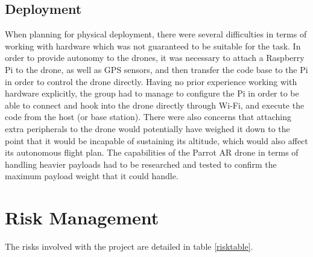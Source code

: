 \subsection{Deployment}
When planning for physical deployment, there were several difficulties in terms of working with hardware which was not guaranteed to be suitable for the task. In order to provide autonomy to the drones, it was necessary to attach a Raspberry Pi to the drone, as well as GPS sensors, and then transfer the code base to the Pi in order to control the drone directly. Having no prior experience working with hardware explicitly, the group had to manage to configure the Pi in order to be able to connect and hook into the drone directly through Wi-Fi, and execute the code from the host (or base station). There were also concerns that attaching extra peripherals to the drone would potentially have weighed it down to the point that it would be incapable of sustaining its altitude, which would also affect its autonomous flight plan. The capabilities of the Parrot AR drone in terms of handling heavier payloads had to be researched and tested to confirm the maximum payload weight that it could handle.

\section{Risk Management}
The risks involved with the project are detailed in table \ref{risktable}.

